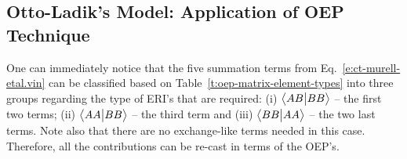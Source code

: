 \subsection{\label{ss:3.3.OEP} Otto-Ladik's Model: Application of OEP Technique}

One can immediately notice that the five summation terms
from Eq.~\eqref{e:ct-murell-etal.vin} can be classified 
based on Table~\ref{t:oep-matrix-element-types} 
into three groups
regarding the type of ERI's that are required:
(i) $\bigl\langle {AB} \bigl\lvert {BB} \bigr\rangle$ -- the first two terms;
(ii) $\bigl\langle {AA} \bigl\lvert {BB} \bigr\rangle$ -- the third term and
(iii) $\bigl\langle {BB} \bigl\lvert {AA} \bigr\rangle$ -- the two last terms. 
Note also that there are no exchange\hyp{}like terms needed in this case.
Therefore, all the contributions can be re\hyp{}cast in terms of the OEP's.

